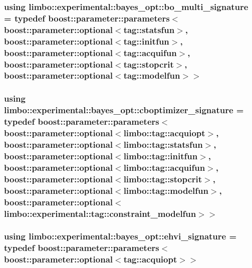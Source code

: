\subsubsection[{\texorpdfstring{bo\+\_\+multi\+\_\+signature}{bo_multi_signature}}]{\setlength{\rightskip}{0pt plus 5cm}using {\bf limbo\+::experimental\+::bayes\+\_\+opt\+::bo\+\_\+multi\+\_\+signature} = typedef boost\+::parameter\+::parameters$<$boost\+::parameter\+::optional$<$tag\+::statsfun$>$, boost\+::parameter\+::optional$<$tag\+::initfun$>$, boost\+::parameter\+::optional$<$tag\+::acquifun$>$, boost\+::parameter\+::optional$<$tag\+::stopcrit$>$, boost\+::parameter\+::optional$<$tag\+::modelfun$>$$>$}\hypertarget{namespacelimbo_1_1experimental_1_1bayes__opt_a571329d2f0470956331c4fbdf32a2a6f}{}\label{namespacelimbo_1_1experimental_1_1bayes__opt_a571329d2f0470956331c4fbdf32a2a6f}
\subsubsection[{\texorpdfstring{cboptimizer\+\_\+signature}{cboptimizer_signature}}]{\setlength{\rightskip}{0pt plus 5cm}using {\bf limbo\+::experimental\+::bayes\+\_\+opt\+::cboptimizer\+\_\+signature} = typedef boost\+::parameter\+::parameters$<$boost\+::parameter\+::optional$<$limbo\+::tag\+::acquiopt$>$, boost\+::parameter\+::optional$<$limbo\+::tag\+::statsfun$>$, boost\+::parameter\+::optional$<$limbo\+::tag\+::initfun$>$, boost\+::parameter\+::optional$<$limbo\+::tag\+::acquifun$>$, boost\+::parameter\+::optional$<$limbo\+::tag\+::stopcrit$>$, boost\+::parameter\+::optional$<$limbo\+::tag\+::modelfun$>$, boost\+::parameter\+::optional$<$limbo\+::experimental\+::tag\+::constraint\+\_\+modelfun$>$$>$}\hypertarget{namespacelimbo_1_1experimental_1_1bayes__opt_ae227a617e3c612fe31b87959b23da719}{}\label{namespacelimbo_1_1experimental_1_1bayes__opt_ae227a617e3c612fe31b87959b23da719}
\subsubsection[{\texorpdfstring{ehvi\+\_\+signature}{ehvi_signature}}]{\setlength{\rightskip}{0pt plus 5cm}using {\bf limbo\+::experimental\+::bayes\+\_\+opt\+::ehvi\+\_\+signature} = typedef boost\+::parameter\+::parameters$<$boost\+::parameter\+::optional$<$tag\+::acquiopt$>$$>$}\hypertarget{namespacelimbo_1_1experimental_1_1bayes__opt_ae8eff4654db4ec2db25b12dcb2a18b52}{}\label{namespacelimbo_1_1experimental_1_1bayes__opt_ae8eff4654db4ec2db25b12dcb2a18b52}
